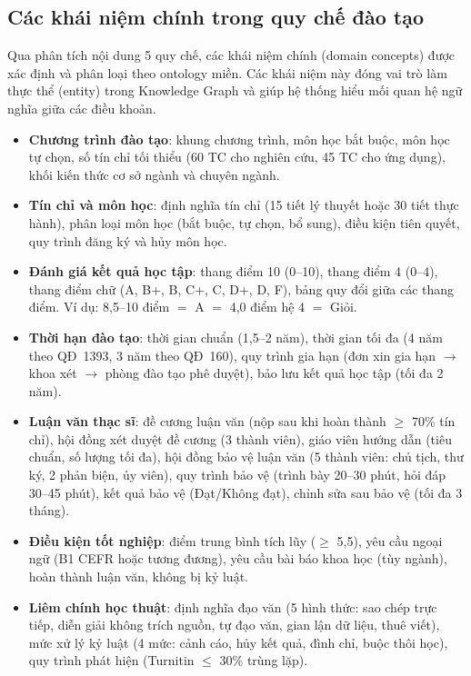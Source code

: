 \subsection{Các khái niệm chính trong quy chế đào tạo}
\label{subsec:khainiemchinh}

Qua phân tích nội dung 5 quy chế, các khái niệm chính (domain concepts) được xác
định và phân loại theo ontology miền. Các khái niệm này đóng vai trò làm thực thể
(entity) trong Knowledge Graph và giúp hệ thống hiểu mối quan hệ ngữ nghĩa giữa
các điều khoản.

\begin{itemize}
    \item \textbf{Chương trình đào tạo}: khung chương trình, môn học bắt buộc, môn
          học tự chọn, số tín chỉ tối thiểu (60 TC cho nghiên cứu, 45 TC cho ứng
          dụng), khối kiến thức cơ sở ngành và chuyên ngành.

    \item \textbf{Tín chỉ và môn học}: định nghĩa tín chỉ (15 tiết lý thuyết hoặc
          30 tiết thực hành), phân loại môn học (bắt buộc, tự chọn, bổ sung), điều
          kiện tiên quyết, quy trình đăng ký và hủy môn học.

    \item \textbf{Đánh giá kết quả học tập}: thang điểm 10 (0--10), thang điểm 4
          (0--4), thang điểm chữ (A, B+, B, C+, C, D+, D, F), bảng quy đổi giữa
          các thang điểm. Ví dụ: 8,5--10 điểm $=$ A $=$ 4,0 điểm hệ 4 $=$ Giỏi.

    \item \textbf{Thời hạn đào tạo}: thời gian chuẩn (1,5--2 năm), thời gian tối
          đa (4 năm theo QĐ~1393, 3 năm theo QĐ~160), quy trình gia hạn (đơn xin
          gia hạn $\to$ khoa xét $\to$ phòng đào tạo phê duyệt), bảo lưu kết quả
          học tập (tối đa 2 năm).

    \item \textbf{Luận văn thạc sĩ}: đề cương luận văn (nộp sau khi hoàn thành
          $\geq$ 70\% tín chỉ), hội đồng xét duyệt đề cương (3 thành viên), giáo
          viên hướng dẫn (tiêu chuẩn, số lượng tối đa), hội đồng bảo vệ luận văn
          (5 thành viên: chủ tịch, thư ký, 2 phản biện, ủy viên), quy trình bảo vệ
          (trình bày 20--30 phút, hỏi đáp 30--45 phút), kết quả bảo vệ (Đạt/Không
          đạt), chỉnh sửa sau bảo vệ (tối đa 3 tháng).

    \item \textbf{Điều kiện tốt nghiệp}: điểm trung bình tích lũy ($\geq$ 5,5),
          yêu cầu ngoại ngữ (B1 CEFR hoặc tương đương), yêu cầu bài báo khoa học
          (tùy ngành), hoàn thành luận văn, không bị kỷ luật.

    \item \textbf{Liêm chính học thuật}: định nghĩa đạo văn (5 hình thức: sao chép
          trực tiếp, diễn giải không trích nguồn, tự đạo văn, gian lận dữ liệu,
          thuê viết), mức xử lý kỷ luật (4 mức: cảnh cáo, hủy kết quả, đình chỉ,
          buộc thôi học), quy trình phát hiện (Turnitin $\leq$ 30\% trùng lặp).
\end{itemize}

